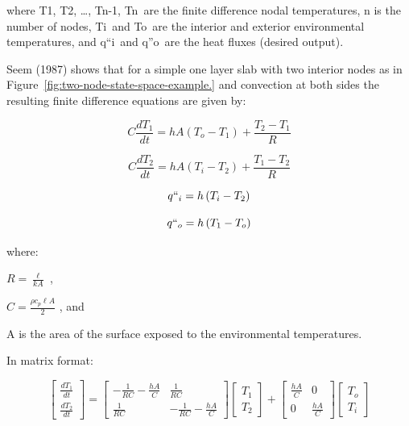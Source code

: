 where T1, T2, \ldots{}, Tn-1, Tn~are the finite difference nodal temperatures, n is the number of nodes, Ti~and To~are the interior and exterior environmental temperatures, and q``i~and q''o~are the heat fluxes (desired output).

Seem (1987) shows that for a simple one layer slab with two interior nodes as in Figure~\ref{fig:two-node-state-space-example.} and convection at both sides the resulting finite difference equations are given by:

\begin{equation}
C\frac{{d{T_1}}}{{dt}} = hA\left( {{T_o} - {T_1}} \right) + \frac{{{T_2} - {T_1}}}{R}
\end{equation}

\begin{equation}
C\frac{{d{T_2}}}{{dt}} = hA\left( {{T_i} - {T_2}} \right) + \frac{{{T_1} - {T_2}}}{R}
\end{equation}

\begin{equation}
q{``_i} = h\left( {{T_i} - {T_2}} \right)
\end{equation}

\begin{equation}
q{``_o} = h\left( {{T_1} - {T_o}} \right)
\end{equation}

where:

\(R = \frac{\ell }{{kA}}\) ,

\(C = \frac{{\rho {c_p}\ell A}}{2}\) , and

A is the area of the surface exposed to the environmental temperatures.

In matrix format:

\begin{equation}
\left[\begin{array}{c}\frac{dT_1}{dt} \\ \frac{dT_2}{dt}\end{array}\right] =
     \left[\begin{array}{cc}-\frac{1}{RC}-\frac{hA}{C} & \frac{1}{RC} \\ \frac{1}{RC} & -\frac{1}{RC}-\frac{hA}{C}\end{array}\right]\left[\begin{array}{c}T_1 \\ T_2\end{array}\right] +
     \left[\begin{array}{cc}\frac{hA}{C} & 0 \\ 0 & \frac{hA}{C}\end{array}\right]\left[\begin{array}{c}T_o \\ T_i\end{array}\right]
\end{equation}

